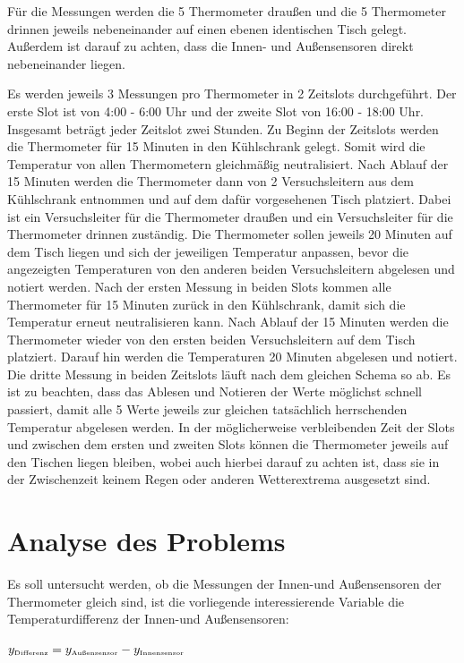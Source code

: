 \documentclass[ ngerman, fontsize= 12pt, paper=a4, headings=big, titlepage=true]{article}
\begin{document}
	Für die Messungen werden die 5 Thermometer draußen und die 5 Thermometer drinnen jeweils nebeneinander auf einen ebenen identischen Tisch gelegt. Außerdem ist darauf zu achten, dass die Innen- und Außensensoren direkt nebeneinander liegen.  \newline
	
	Es werden jeweils 3 Messungen pro Thermometer in 2 Zeitslots durchgeführt. Der erste Slot ist von 4:00 - 6:00 Uhr und der zweite Slot von 16:00 - 18:00 Uhr. Insgesamt beträgt jeder Zeitslot zwei Stunden. Zu Beginn der Zeitslots werden die Thermometer für 15 Minuten in den Kühlschrank gelegt. Somit wird die Temperatur von allen Thermometern gleichmäßig neutralisiert. Nach Ablauf der 15 Minuten werden die Thermometer dann von 2 Versuchsleitern aus dem Kühlschrank entnommen und auf dem dafür vorgesehenen Tisch platziert. Dabei ist ein Versuchsleiter für die Thermometer draußen und ein Versuchsleiter für die Thermometer drinnen zuständig. Die Thermometer sollen jeweils 20 Minuten auf dem Tisch liegen und sich der jeweiligen Temperatur anpassen, bevor die angezeigten Temperaturen von den anderen beiden Versuchsleitern abgelesen und notiert werden. Nach der ersten Messung in beiden Slots kommen alle Thermometer für 15 Minuten zurück in den Kühlschrank, damit sich die Temperatur erneut neutralisieren kann. Nach Ablauf der 15 Minuten werden die Thermometer wieder von den ersten beiden Versuchsleitern auf dem Tisch platziert. Darauf hin werden die Temperaturen 20 Minuten abgelesen und notiert. Die dritte Messung in beiden Zeitslots läuft nach dem gleichen Schema so ab. Es ist zu beachten, dass das Ablesen und Notieren der Werte möglichst schnell passiert, damit alle 5 Werte jeweils zur gleichen tatsächlich herrschenden Temperatur abgelesen werden. In der möglicherweise verbleibenden Zeit der Slots und zwischen dem ersten und zweiten Slots können die Thermometer jeweils auf den Tischen liegen bleiben, wobei auch hierbei darauf zu achten ist, dass sie in der Zwischenzeit keinem Regen oder anderen Wetterextrema ausgesetzt sind.
	
	
	
	\section{Analyse des Problems}
	
	Es soll untersucht werden, ob die Messungen der Innen-und Außensensoren der Thermometer gleich sind, ist die vorliegende interessierende Variable die Temperaturdifferenz der Innen-und Außensensoren:\\
	\begin{center}
		$y_{\text{\tiny{Differenz}}} = y_{\text{\tiny{Außensensor}}}-y_{\text{\tiny{Innensensor}}} $
	\end{center}
	
\end{document}
